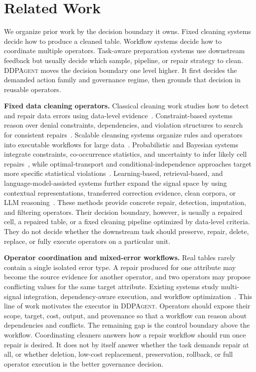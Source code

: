 \documentclass[sigconf, nonacm]{acmart}
\newcommand{\sys}{\textsc{DDPAgent}\xspace}
\begin{document}
\section{Related Work}
\label{sec:related}

We organize prior work by the decision boundary it owns. Fixed cleaning systems decide how to produce a cleaned table. Workflow systems decide how to coordinate multiple operators. Task-aware preparation systems use downstream feedback but usually decide which sample, pipeline, or repair strategy to clean. \sys moves the decision boundary one level higher. It first decides the demanded action family and governance regime, then grounds that decision in reusable operators.

\textbf{Fixed data cleaning operators.}
Classical cleaning work studies how to detect and repair data errors using data-level evidence~\cite{abedjan2016detecting}. Constraint-based systems reason over denial constraints, dependencies, and violation structures to search for consistent repairs~\cite{chu2013holistic,horizon}. Scalable cleansing systems organize rules and operators into executable workflows for large data~\cite{khayyat2015bigdansing}. Probabilistic and Bayesian systems integrate constraints, co-occurrence statistics, and uncertainty to infer likely cell repairs~\cite{rekatsinas2017holoclean,qin2024bclean}, while optimal-transport and conditional-independence approaches target more specific statistical violations~\cite{pirhadi2024otclean}. Learning-based, retrieval-based, and language-model-assisted systems further expand the signal space by using contextual representations, transferred correction evidence, clean corpora, or LLM reasoning~\cite{mahdavi2019raha,mahdavi2019baran,heidari2024lopster,naeem2024retclean,yan2024gidcl,ni2025zeroed}. These methods provide concrete repair, detection, imputation, and filtering operators. Their decision boundary, however, is usually a repaired cell, a repaired table, or a fixed cleaning pipeline optimized by data-level criteria. They do not decide whether the downstream task should preserve, repair, delete, replace, or fully execute operators on a particular unit.

\textbf{Operator coordination and mixed-error workflows.}
Real tables rarely contain a single isolated error type. A repair produced for one attribute may become the source evidence for another operator, and two operators may propose conflicting values for the same target attribute. Existing systems study multi-signal integration, dependency-aware execution, and workflow optimization~\cite{rekatsinas2017holoclean,khayyat2015bigdansing,horizon,siddiqi2024saga,mohammed2025stepbystep}. This line of work motivates the executor in \sys. Operators should expose their scope, target, cost, output, and provenance so that a workflow can reason about dependencies and conflicts. The remaining gap is the control boundary above the workflow. Coordinating cleaners answers how a repair workflow should run once repair is desired. It does not by itself answer whether the task demands repair at all, or whether deletion, low-cost replacement, preservation, rollback, or full operator execution is the better governance decision.
\end{document}

